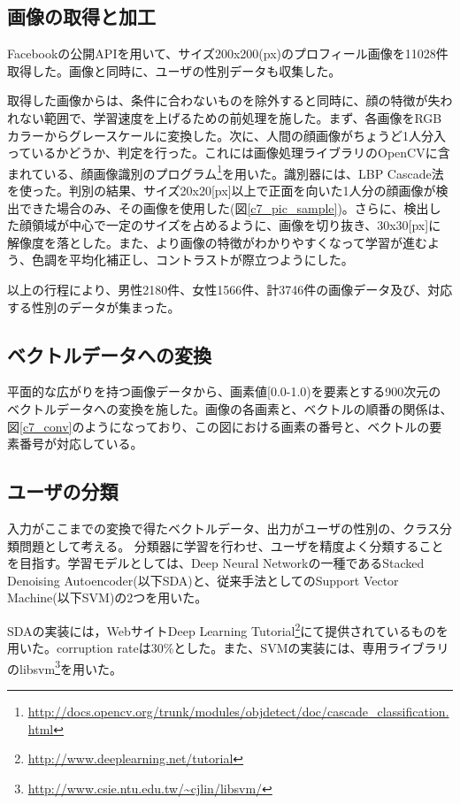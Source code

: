 \subsection{画像の取得と加工}
Facebookの公開APIを用いて、サイズ200x200(px)のプロフィール画像を11028件取得した。画像と同時に、ユーザの性別データも収集した。\par
取得した画像からは、条件に合わないものを除外すると同時に、顔の特徴が失われない範囲で、学習速度を上げるための前処理を施した。まず、各画像をRGBカラーからグレースケールに変換した。次に、人間の顔画像がちょうど1人分入っているかどうか、判定を行った。これには画像処理ライブラリのOpenCVに含まれている、顔画像識別のプログラム\footnote{\url{http://docs.opencv.org/trunk/modules/objdetect/doc/cascade_classification.html}}を用いた。識別器には、LBP Cascade法\cite{liao2007learning}を使った。判別の結果、サイズ20x20[px]以上で正面を向いた1人分の顔画像が検出できた場合のみ、その画像を使用した(図\ref{c7_pic_sample})。さらに、検出した顔領域が中心で一定のサイズを占めるように、画像を切り抜き、30x30[px]に解像度を落とした。また、より画像の特徴がわかりやすくなって学習が進むよう、色調を平均化補正し、コントラストが際立つようにした。\par
以上の行程により、男性2180件、女性1566件、計3746件の画像データ及び、対応する性別のデータが集まった。
\subsection{ベクトルデータへの変換}
平面的な広がりを持つ画像データから、画素値[0.0-1.0)を要素とする900次元のベクトルデータへの変換を施した。画像の各画素と、ベクトルの順番の関係は、図\ref{c7_conv}のようになっており、この図における画素の番号と、ベクトルの要素番号が対応している。
\subsection{ユーザの分類}
入力がここまでの変換で得たベクトルデータ、出力がユーザの性別の、クラス分類問題として考える。
分類器に学習を行わせ、ユーザを精度よく分類することを目指す。学習モデルとしては、Deep Neural Networkの一種であるStacked Denoising Autoencoder(以下SDA)と、従来手法としてのSupport Vector Machine(以下SVM)の2つを用いた。\par
SDAの実装には，WebサイトDeep Learning Tutorial\footnote{\url{http://www.deeplearning.net/tutorial}}にて提供されているものを用いた。corruption rateは30\%とした。また、SVMの実装には、専用ライブラリのlibsvm\footnote{\url{http://www.csie.ntu.edu.tw/~cjlin/libsvm/}}を用いた。
\par

